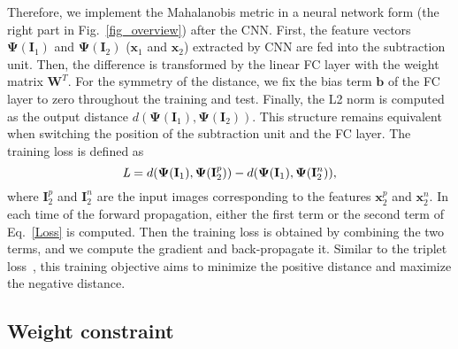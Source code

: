 \documentclass[10pt,twocolumn,letterpaper]{article}
\begin{document}
Therefore, we implement the Mahalanobis metric in a neural network form (the right part in Fig.~\ref{fig_overview}) after the CNN.
First, the feature vectors $\mathbf{\Psi}(\mathbf{I}_1)$ and $\mathbf{\Psi}(\mathbf{I}_2)$ (\ie $\mathbf{x}_1$ and $\mathbf{x}_2$) extracted by CNN are fed into the subtraction unit.
Then, the difference is transformed by the linear FC layer with the weight matrix $\textbf{W}^T$.
For the symmetry of the distance, we fix the bias term $\mathbf{b}$ of the FC layer to zero throughout the training and test.
Finally, the L2 norm is computed as the output distance $d(\mathbf{\Psi}(\mathbf{I}_1), \mathbf{\Psi}(\mathbf{I}_2))$.
This structure remains equivalent when switching the position of the subtraction unit and the FC layer.
The training loss is defined as
\begin{equation}\label{Loss}
    \mathbf{\emph{L}} = d(\mathbf{\Psi}(\mathbf{I}_1), \mathbf{\Psi}(\mathbf{I}_2^p)) - d(\mathbf{\Psi}(\mathbf{I}_1), \mathbf{\Psi}(\mathbf{I}_2^n)),
\end{equation}
where $\mathbf{I}_2^p$ and $\mathbf{I}_2^n$ are the input images corresponding to the features $\mathbf{x}_2^p$ and $\mathbf{x}_2^n$.
In each time of the forward propagation, either the first term or the second term of Eq.~\ref{Loss} is computed.
Then the training loss is obtained by combining the two terms, and we compute the gradient and back-propagate it.
Similar to the triplet loss~\cite{schroff2015facenet}, this training objective aims to minimize the positive distance and maximize the negative distance.

\subsection{Weight constraint}
\label{section_Weight_constraint}
\end{document}
